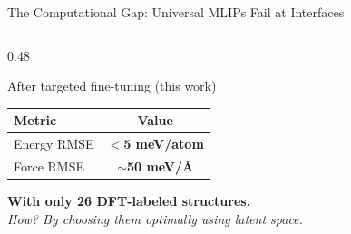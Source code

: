 \documentclass[aspectratio=169,10pt]{beamer}
\newcommand{\wintext}[1]{\textcolor{wincolor}{\textbf{#1}}}
\newcommand{\goldtext}[1]{\textcolor{iiscgold}{\textbf{#1}}}
\begin{document}
\begin{frame}{The Computational Gap: Universal MLIPs Fail at Interfaces}
\begin{columns}[T]
\begin{column}{0.48\textwidth}
    \vspace{0.5em}
    \begin{exampleblock}{After targeted fine-tuning (this work)}
      \centering\vspace{0.2em}
      \begin{tabular}{lc}
        \toprule
        Metric & Value \\
        \midrule
        Energy RMSE & \wintext{$<$5 meV/atom} \\
        Force RMSE  & \wintext{$\sim$50 meV/\AA} \\
        \bottomrule
      \end{tabular}\vspace{0.2em}
    \end{exampleblock}

    \vspace{0.6em}
    \centering
    \textbf{With only \goldtext{26 DFT-labeled structures}.}\\[0.3em]
    \textit{How? By choosing them optimally using latent space.}
  \end{column}
\end{columns}
\end{frame}
\end{document}
